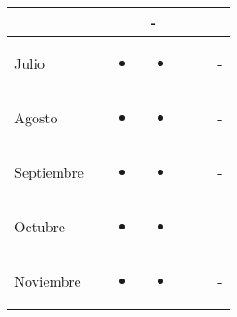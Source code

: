\documentclass[landscape, a4paper, 10pt]{article}
\newcommand{\smallcellwidth}{0.7in}
\newcommand{\normalcellwidth}{1.2in}
\newcommand{\bigcellwidth}{2.0in}
\begin{document}
\begin{longtable}{|m{\smallcellwidth}|p{\normalcellwidth}|p{\bigcellwidth}|p{\bigcellwidth}|p{\normalcellwidth}|p{\normalcellwidth}|p{\normalcellwidth}|}
\begin{itemize}
		\end{itemize} &
		  &
		  &
		 - \\
		\hline
		Julio &
		 &
		\begin{itemize}
			\item 
		\end{itemize} &
		\begin{itemize}
			\item 
		\end{itemize} &
		  &
		  &
		 - \\
		\hline
		Agosto &
		 &
		\begin{itemize}
			\item 
		\end{itemize} &
		\begin{itemize}
			\item 
		\end{itemize} &
		  &
		  &
		 - \\
		\hline
		Septiembre &
		 &
		\begin{itemize}
			\item 
		\end{itemize} &
		\begin{itemize}
			\item 
		\end{itemize} &
		  &
		  &
		 - \\
		\hline
		Octubre &
		 &
		\begin{itemize}
			\item 
		\end{itemize} &
		\begin{itemize}
			\item 
		\end{itemize} &
		  &
		  &
		 - \\
		\hline
		Noviembre &
		 &
		\begin{itemize}
			\item 
		\end{itemize} &
		\begin{itemize}
			\item 
		\end{itemize} &
		  &
		  &
		 - \\
		\hline

	\end{longtable}
\end{document}
